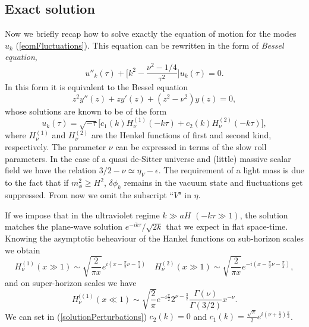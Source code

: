 \documentclass[11pt,a4paper,twoside]{book}
\begin{document}
\subsection{Exact solution}
Now we briefly recap how to solve exactly the equation of motion for the modes $ u_{k} $ (\ref{eomFluctuations}). This equation can be rewritten in the form of \textit{Bessel equation},
\begin{equation}
	\label{bessel}
	u''_{k}(\tau) + \Big[k^{2} - \frac{\nu^{2}-1/4}{\tau^{2}}\Big] u_{k}(\tau)=0.
\end{equation}
In this form it is equivalent to the Bessel equation
\begin{equation}
	z^{2}y''(z) + zy'(z) + (z^{2}-\nu^{2})y(z)=0,
\end{equation}				
whose solutions are known to be of the form 
\begin{equation}
	\label{solutionPerturbations}
	u_{k}(\tau) = \sqrt{-\tau}\big [c_{1}(k)H^{(1)}_{\nu}(-k\tau) + c_{2}(k)H_{\nu}^{(2)}(-k\tau)],
\end{equation}
where $ H^{(1)}_{\nu} $ and $ H^{(2)}_{\nu} $ are the Henkel functions of first and second kind, respectively.
The parameter $ \nu $ can be expressed in terms of the slow roll parameters.
In the case of a quasi de-Sitter universe and  (little) massive scalar field we have the relation $ 3/2 - \nu \simeq \eta_{V} - \epsilon$.
 The requirement  of a light mass is due to the fact that if $ m^{2}_{\phi} \ge H^{2}$,  $ \delta \phi_{k} $ remains in the vacuum state and fluctuations get suppressed. From now we omit the subscript \textquotedblleft $V$" in $\eta$.
 
If we impose  that in the ultraviolet regime $ k \gg aH $ $ (-k\tau \gg 1) $, the solution matches the plane-wave solution $ e^{-ik\tau}/\sqrt{2k} $ that we expect in flat space-time. Knowing the asymptotic beheaviour of the Hankel functions on sub-horizon scales we obtain
\begin{equation}
\label{Hankel1}
H^{(1)}_{\nu}(x \gg 1) \sim \sqrt{\frac{2}{\pi x}} e^{i(x-\frac{\pi}{2}\nu-\frac{\pi}{4})} 
\quad
H^{(2)}_{\nu}(x \gg 1) \sim \sqrt{\frac{2}{\pi x}} e^{-i(x-\frac{\pi}{2}\nu-\frac{\pi}{4})},
\end{equation}
and on super-horizon scales we have
\begin{equation}
\label{Hankel2}
H^{((1)}_{\nu}(x \ll 1) \sim \sqrt{\frac{2}{\pi}}e^{-i\frac{\pi}{2}}2^{\nu-\frac{3}{2}}\frac{\Gamma(\nu)}{\Gamma(3/2)}x^{-\nu}.	
\end{equation}
We can set in (\ref{solutionPerturbations})  $ c_{2}(k)=0 $ and $ c_{1}(k)=\frac{\sqrt{\pi}}{2}e^{i(\nu + \frac{1}{2})\frac{\pi}{2}} $.
\end{document}
